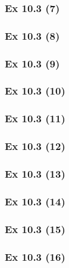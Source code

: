\subsubsection{Ex 10.3 (7)}\label{sec:Ex_10.3.7}

\subsubsection{Ex 10.3 (8)}\label{sec:Ex_10.3.8}

\subsubsection{Ex 10.3 (9)}\label{sec:Ex_10.3.9}

\subsubsection{Ex 10.3 (10)}\label{sec:Ex_10.3.10}

\newpage		%

\subsubsection{Ex 10.3 (11)}\label{sec:Ex_10.3.11}

\subsubsection{Ex 10.3 (12)}\label{sec:Ex_10.3.12}

\subsubsection{Ex 10.3 (13)}\label{sec:Ex_10.3.13}

\subsubsection{Ex 10.3 (14)}\label{sec:Ex_10.3.14}

\subsubsection{Ex 10.3 (15)}\label{sec:Ex_10.3.15}

\subsubsection{Ex 10.3 (16)}\label{sec:Ex_10.3.16}

